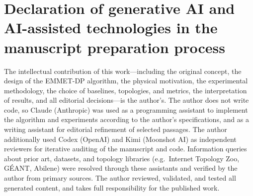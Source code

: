 \section*{Declaration of generative AI and AI-assisted technologies in the manuscript preparation process}

The intellectual contribution of this work---including the original
concept, the design of the EMMET-DP algorithm, the physical
motivation, the experimental methodology, the choice of baselines,
topologies, and metrics, the interpretation of results, and all
editorial decisions---is the author's. The author does not write code,
so Claude (Anthropic) was used as a programming assistant to implement
the algorithm and experiments according to the author's specifications,
and as a writing assistant for editorial refinement of selected
passages. The author additionally used Codex (OpenAI) and Kimi
(Moonshot AI) as independent reviewers for iterative auditing of the
manuscript and code. Information queries about prior art, datasets,
and topology libraries (e.g.\ Internet Topology Zoo, GÉANT, Abilene)
were resolved through these assistants and verified by the author from
primary sources. The author reviewed, validated, and tested all
generated content, and takes full responsibility for the published
work.

